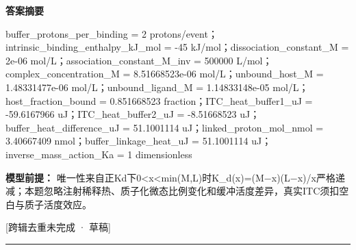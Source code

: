 \documentclass[UTF8,11pt,a4paper]{ctexart}
\begin{document}
\noindent\textbf{答案摘要}\par
buffer\_protons\_per\_binding = 2 protons/event；intrinsic\_binding\_enthalpy\_kJ\_mol = -45 kJ/mol；dissociation\_constant\_M = 2e-06 mol/L；association\_constant\_M\_inv = 500000 L/mol；complex\_concentration\_M = 8.51668523e-06 mol/L；unbound\_host\_M = 1.48331477e-06 mol/L；unbound\_ligand\_M = 1.14833148e-05 mol/L；host\_fraction\_bound = 0.851668523 fraction；ITC\_heat\_buffer1\_uJ = -59.6167966 uJ；ITC\_heat\_buffer2\_uJ = -8.51668523 uJ；buffer\_heat\_difference\_uJ = 51.1001114 uJ；linked\_proton\_mol\_nmol = 3.40667409 nmol；buffer\_linkage\_heat\_uJ = 51.1001114 uJ；inverse\_mass\_action\_Ka = 1 dimensionless\par
\noindent\textbf{模型前提：}
唯一性来自正Kd下0<x<min(M,L)时K\_d(x)=(M−x)(L−x)/x严格递减；本题忽略注射稀释热、质子化微态比例变化和缓冲活度差异，真实ITC须扣空白与质子活度效应。\par
\noindent\textcolor{red!65!black}{[跨辑去重未完成 · 草稿]} \par
\medskip\hrule\medskip
{}
\end{document}
